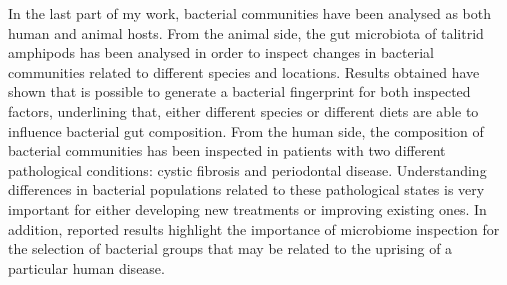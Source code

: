 In the last part of my work, bacterial communities have been analysed as both human and animal hosts. From the animal side, the gut microbiota of talitrid amphipods has been analysed in order to inspect changes in bacterial communities related to different species and locations. Results obtained have shown that is possible to generate a bacterial fingerprint for both inspected factors, underlining that, either different species or different diets are able to influence bacterial gut composition. From the human side, the composition of bacterial communities has been inspected in patients with two different pathological conditions: cystic fibrosis and periodontal disease. Understanding differences in bacterial populations related to these pathological states is very important for either developing new treatments or improving existing ones. In addition, reported results highlight the importance of microbiome inspection for the selection of bacterial groups that may be related to the uprising of a particular human disease.\\